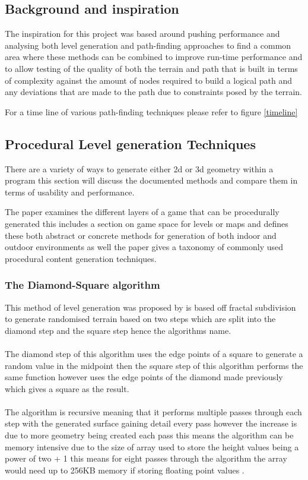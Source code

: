 
\setlength\parindent{0cm}

\subsection{Background and inspiration}
The inspiration for this project was based around pushing performance and analysing both level generation and path-finding approaches to find a common area where these methods can be combined to improve run-time performance and to allow testing of the quality of both the terrain and path that is built in terms of complexity against the amount of nodes required to build a logical path and any deviations that are made to the path due to constraints posed by the terrain. 

For a time line of various path-finding techniques please refer to figure \ref{timeline} 
\subsection{Procedural Level generation Techniques}
There are a variety of ways to generate either 2d or 3d geometry within a program this section will discuss the documented methods and compare them in terms of usability and performance.

The paper \cite{LG-Survey} examines the different layers of a game that can be procedurally generated this includes a section on game space for levels or maps and defines these both abstract or concrete methods for generation of both indoor and outdoor environments as well the paper gives a taxonomy of commonly used procedural content generation techniques.  

\subsubsection{The Diamond-Square algorithm}
This method of level generation was proposed by \cite{DSA2} is based off fractal subdivision to generate randomised terrain based on two steps which are split into the diamond step  and the square step hence the algorithms name.\\\\ The diamond step of this algorithm uses the edge points of a square to generate a random value in the midpoint then the square step of this algorithm performs the same function however uses the edge points of the diamond made previously which gives a square as the result. \\\\The algorithm is recursive meaning that it performs multiple passes through each step with the generated surface gaining detail every pass however the increase is due to more geometry being created each pass this means the algorithm can be memory intensive due to the size of array used to store the height values being a power of two + 1 this means for eight passes through the algorithm the array would need up to 256KB memory if storing floating point values \cite{LevelDSA}.

